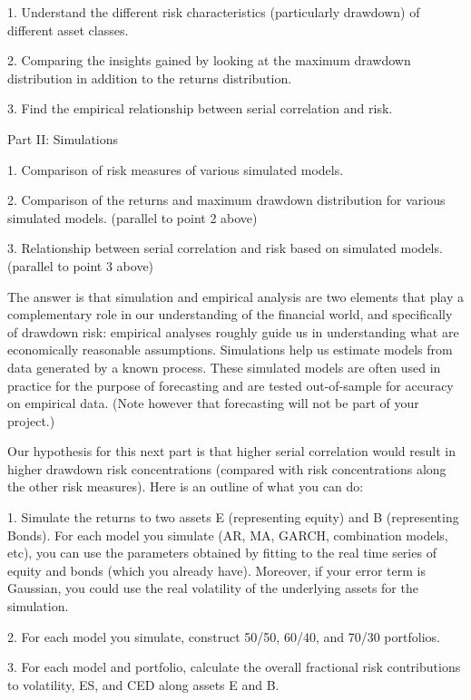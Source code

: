 \documentclass[11pt]{article}
\begin{document}
1. Understand the different risk characteristics (particularly drawdown) of different asset classes.

2. Comparing the insights gained by looking at the maximum drawdown distribution in addition to the returns distribution.

3. Find the empirical relationship between serial correlation and risk.


Part II: Simulations

1. Comparison of risk measures of various simulated models.

2. Comparison of the returns and maximum drawdown distribution for various simulated models. (parallel to point 2 above)

3. Relationship between serial correlation and risk based on simulated models. (parallel to point 3 above)


The answer is that simulation and empirical analysis are two elements that play a complementary role in our understanding of the financial world, and specifically of drawdown risk: empirical analyses roughly guide us in understanding what are economically reasonable assumptions. Simulations help us estimate models from data generated by a known process. These simulated models are often used in practice for the purpose of forecasting and are tested out-of-sample for accuracy on empirical data. (Note however that forecasting will not be part of your project.)


Our hypothesis for this next part is that higher serial correlation would result in higher drawdown risk concentrations (compared with risk concentrations along the other risk measures). Here is an outline of what you can do:

1. Simulate the returns to two assets E (representing equity) and B (representing Bonds). For each model you simulate (AR, MA, GARCH, combination models, etc), you can use the parameters obtained by fitting to the real time series of equity and bonds (which you already have). Moreover, if your error term is Gaussian, you could use the real volatility of the underlying assets for the simulation.

2. For each model you simulate, construct 50/50, 60/40, and 70/30 portfolios.

3. For each model and portfolio, calculate the overall fractional risk contributions to volatility, ES, and CED along assets E and B.
\end{document}

